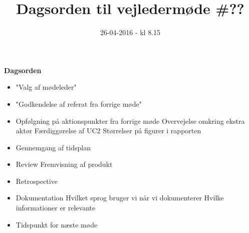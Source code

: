 \documentclass{article}
\title{Dagsorden til vejledermøde \#??}
\date{26-04-2016 - kl 8.15}
\begin{document}
	\maketitle
	\textbf{Dagsorden}
	
	\begin{itemize}
		\item "Valg af mødeleder"
		\item "Godkendelse af referat fra forrige møde" 
		\item Opfølgning på aktionspunkter fra forrige møde
			\subitem Overvejelse omkring ekstra aktør
			\subitem Færdiggørelse af UC2
			\subitem Størrelser på figurer i rapporten
		\item Gennemgang af tidsplan
		\item Review
			\subitem Fremvisning af produkt
		\item Retrospective
		\item Dokumentation
			\subitem Hvilket sprog bruger vi når vi dokumenterer
			\subitem Hvilke informationer er relevante
		\item Tidspunkt for næste møde
	\end{itemize}
\end{document}
